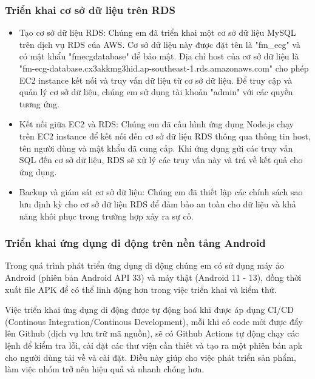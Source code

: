 \subsubsection{Triển khai cơ sở dữ liệu trên RDS}
\begin{itemize}
  \item Tạo cơ sở dữ liệu RDS: Chúng em đã triển khai một cơ sở dữ liệu MySQL trên dịch vụ RDS của AWS. Cơ sở dữ liệu này được đặt tên là "fm\_ecg" và có mật khẩu "fmecgdatabase" để bảo mật. Địa chỉ host của cơ sở dữ liệu là 
  "fm-ecg-database.cx3akkmg3hid.ap-southeast-1.rds.amazonaws.com" cho phép EC2 instance kết nối và truy vấn dữ liệu từ cơ sở dữ liệu. Để truy cập và quản lý cơ sở dữ liệu, chúng em sử dụng tài khoản "admin" với các quyền tương ứng.
  \item Kết nối giữa EC2 và RDS: Chúng em đã cấu hình ứng dụng Node.js chạy trên EC2 instance để kết nối đến cơ sở dữ liệu RDS thông qua thông tin host, tên người dùng và mật khẩu đã cung cấp. Khi ứng dụng gửi các truy vấn SQL đến cơ sở dữ liệu, RDS sẽ xử lý các truy vấn này và trả về kết quả cho ứng dụng.
  \item Backup và giám sát cơ sở dữ liệu: Chúng em đã thiết lập các chính sách sao lưu định kỳ cho cơ sở dữ liệu RDS để đảm bảo an toàn cho dữ liệu và khả năng khôi phục trong trường hợp xảy ra sự cố.
\end{itemize}

\subsubsection{Triển khai ứng dụng di động trên nền tảng Android}
Trong quá trình phát triển ứng dụng di động chúng em có sử dụng máy ảo Android (phiên bản Android API 33) và máy thật
(Android 11 - 13), đồng thời xuất file APK để có thể linh động hơn trong việc triển khai và kiểm thử.

Việc triển khai ứng dụng di động được tự động hoá khi được áp dụng CI/CD \cite{ci_cd_intro} (Continous Integration/Continous Development), mỗi khi có
code mới được đẩy lên Github (dịch vụ lưu trữ mã nguồn), sẽ có Github Actions tự động chạy các lệnh để kiểm tra lỗi, cài đặt
các thư viện cần thiết và tạo ra một phiên bản apk cho người dùng tải về và cài đặt. Điều này giúp cho việc phát triển sản phẩm, 
làm việc nhóm trở nên hiệu quả và nhanh chóng hơn.


